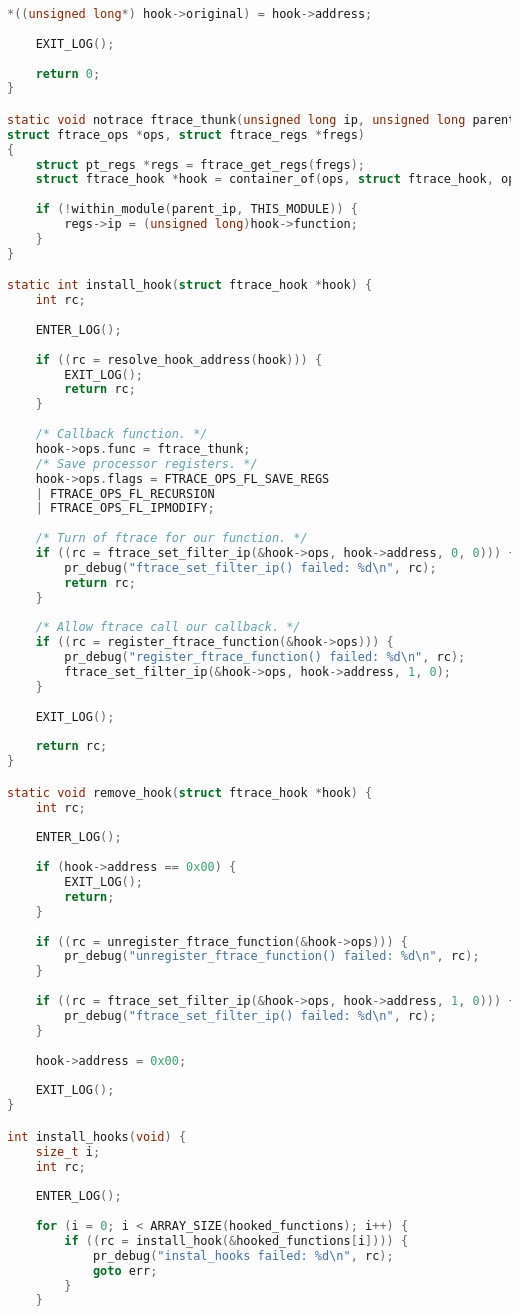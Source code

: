 \begin{lstlisting}[label=lst:log, caption=Листинг файла hooks.c, language=c]
	*((unsigned long*) hook->original) = hook->address;
	
	EXIT_LOG();
	
	return 0;
}

static void notrace ftrace_thunk(unsigned long ip, unsigned long parent_ip,
struct ftrace_ops *ops, struct ftrace_regs *fregs)
{
	struct pt_regs *regs = ftrace_get_regs(fregs);
	struct ftrace_hook *hook = container_of(ops, struct ftrace_hook, ops);
	
	if (!within_module(parent_ip, THIS_MODULE)) {
		regs->ip = (unsigned long)hook->function;
	}
}

static int install_hook(struct ftrace_hook *hook) {
	int rc;
	
	ENTER_LOG();
	
	if ((rc = resolve_hook_address(hook))) {
		EXIT_LOG();
		return rc;
	}
	
	/* Callback function. */
	hook->ops.func = ftrace_thunk; 
	/* Save processor registers. */
	hook->ops.flags = FTRACE_OPS_FL_SAVE_REGS
	| FTRACE_OPS_FL_RECURSION
	| FTRACE_OPS_FL_IPMODIFY;
	
	/* Turn of ftrace for our function. */
	if ((rc = ftrace_set_filter_ip(&hook->ops, hook->address, 0, 0))) {
		pr_debug("ftrace_set_filter_ip() failed: %d\n", rc);
		return rc;
	}
	
	/* Allow ftrace call our callback. */
	if ((rc = register_ftrace_function(&hook->ops))) {
		pr_debug("register_ftrace_function() failed: %d\n", rc);
		ftrace_set_filter_ip(&hook->ops, hook->address, 1, 0);
	}
	
	EXIT_LOG();
	
	return rc;
}

static void remove_hook(struct ftrace_hook *hook) {
	int rc;
	
	ENTER_LOG();
	
	if (hook->address == 0x00) {
		EXIT_LOG();
		return;
	}
	
	if ((rc = unregister_ftrace_function(&hook->ops))) {
		pr_debug("unregister_ftrace_function() failed: %d\n", rc);
	}
	
	if ((rc = ftrace_set_filter_ip(&hook->ops, hook->address, 1, 0))) {
		pr_debug("ftrace_set_filter_ip() failed: %d\n", rc);
	}
	
	hook->address = 0x00;
	
	EXIT_LOG();
}

int install_hooks(void) {
	size_t i;
	int rc;
	
	ENTER_LOG();
	
	for (i = 0; i < ARRAY_SIZE(hooked_functions); i++) {
		if ((rc = install_hook(&hooked_functions[i]))) {
			pr_debug("instal_hooks failed: %d\n", rc);
			goto err;
		}
	}
	

\end{lstlisting}
